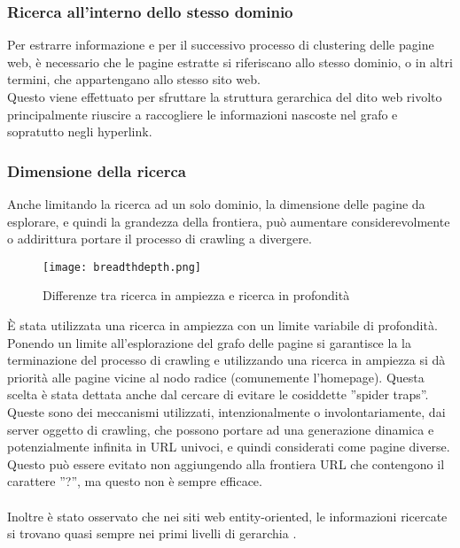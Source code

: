 \subsubsection{Ricerca all'interno dello stesso dominio}
Per estrarre informazione e per il successivo processo di clustering delle pagine web, è necessario che le pagine estratte si riferiscano allo stesso dominio, o in altri termini, che appartengano allo stesso sito web.
\\
Questo viene effettuato per sfruttare la struttura gerarchica del dito web rivolto principalmente riuscire a  raccogliere le informazioni nascoste nel grafo e sopratutto negli hyperlink.

\subsubsection{Dimensione della ricerca}
Anche limitando la ricerca ad un solo dominio, la dimensione delle pagine da esplorare, e quindi la grandezza della frontiera, può aumentare considerevolmente o addirittura portare il processo di crawling a divergere.

\begin{figure}[htb]
	\centering
	\texttt{[image: breadthdepth.png]}
	\caption{Differenze tra ricerca in ampiezza e ricerca in profondità}
	\label{breadthsearch}
\end{figure}

È stata utilizzata una ricerca in ampiezza con un limite variabile di profondità. Ponendo un limite all'esplorazione del grafo delle pagine si garantisce la la terminazione del processo di crawling e utilizzando una ricerca in ampiezza si dà priorità alle pagine vicine al nodo radice (comunemente l'homepage). Questa scelta è stata dettata anche dal cercare di evitare le cosiddette ''spider traps''. Queste sono dei meccanismi utilizzati, intenzionalmente o involontariamente, dai server oggetto di crawling, che possono portare ad una generazione dinamica e potenzialmente infinita in URL univoci, e quindi considerati come pagine diverse. Questo può essere evitato non aggiungendo alla frontiera URL che contengono il carattere ''?'', ma questo non è sempre efficace.
\\\\
Inoltre è stato osservato che nei siti web entity-oriented, le informazioni ricercate si trovano quasi sempre nei primi livelli di gerarchia \cite{He13}.

